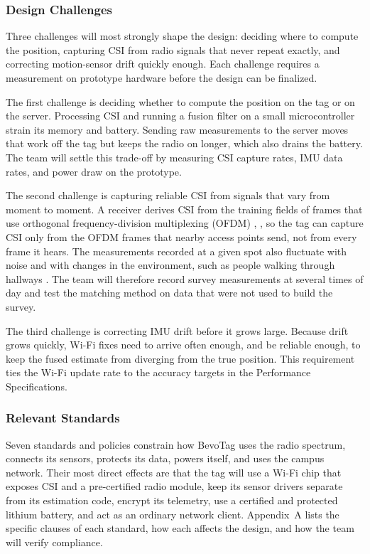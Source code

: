 \documentclass[12pt,letterpaper]{article}
\begin{document}
\subsubsection{Design Challenges}
Three challenges will most strongly shape the design: deciding where to compute the position,
capturing CSI from radio signals that never repeat exactly, and correcting motion-sensor drift
quickly enough. Each challenge requires a measurement on prototype hardware before the design can
be finalized.

The first challenge is deciding whether to compute the position on the tag or on the server.
Processing CSI and running a fusion filter on a small microcontroller strain its memory and
battery. Sending raw measurements to the server moves that work off the tag but keeps the radio on
longer, which also drains the battery. The team will settle this trade-off by measuring CSI capture
rates, IMU data rates, and power draw on the prototype.

The second challenge is capturing reliable CSI from signals that vary from moment to moment. A
receiver derives CSI from the training fields of frames that use orthogonal frequency-division
multiplexing (OFDM) \cite{espcsi}, \cite{std80211}, so the tag can capture CSI only from the OFDM
frames that nearby access points send, not from every frame it hears. The measurements recorded at
a given spot also fluctuate with noise and with changes in the environment, such as people walking
through hallways \cite{hechan}. The team will therefore record survey measurements at several times
of day and test the matching method on data that were not used to build the survey.

The third challenge is correcting IMU drift before it grows large. Because drift grows quickly,
Wi-Fi fixes need to arrive often enough, and be reliable enough, to keep the fused estimate from
diverging from the true position. This requirement ties the Wi-Fi update rate to the accuracy
targets in the Performance Specifications.

\subsubsection{Relevant Standards}
Seven standards and policies constrain how BevoTag uses the radio spectrum, connects its sensors,
protects its data, powers itself, and uses the campus network. Their most direct effects are that
the tag will use a Wi-Fi chip that exposes CSI and a pre-certified radio module, keep its sensor
drivers separate from its estimation code, encrypt its telemetry, use a certified and protected
lithium battery, and act as an ordinary network client. Appendix~A lists the specific clauses of
each standard, how each affects the design, and how the team will verify compliance.
\end{document}
